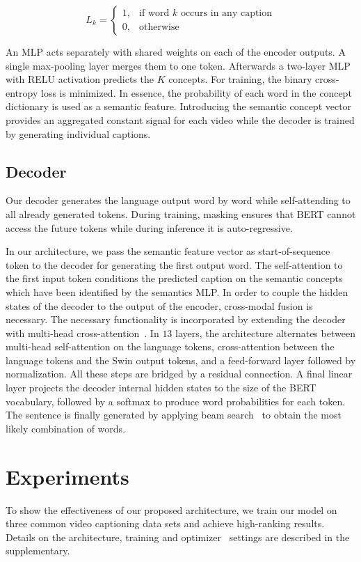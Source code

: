 \documentclass[runningheads,table]{llncs}
\begin{document}
$$
L_{k}=\begin{cases}
			1, & \text{if word }k \text{ occurs in any caption}\\
            0, & \text{otherwise}
		 \end{cases}
$$

An MLP acts separately with shared weights on each of the encoder outputs. A single max-pooling layer merges them to one token. Afterwards a two-layer MLP with RELU activation predicts the $K$ concepts. For training, the binary cross-entropy loss is minimized. In essence, the probability of each word in the concept dictionary is used as a semantic feature.
Introducing the semantic concept vector provides an aggregated constant signal for each video while the decoder is trained by generating individual captions. 

\subsection{Decoder}
Our decoder generates the language output word by word while self-attending to all already generated tokens. During training, masking ensures that BERT cannot access the future tokens while during inference it is auto-regressive. 

In our architecture, we pass the semantic feature vector as start-of-sequence token to the decoder for generating the first output word. The self-attention to the first input token conditions the predicted caption on the semantic concepts which have been identified by the semantics MLP.
In order to couple the hidden states of the decoder to the output of the encoder, cross-modal fusion is necessary. The necessary functionality is incorporated by extending the decoder with multi-head cross-attention~\cite{vaswani2017attention}. In $13$ layers, the architecture alternates between multi-head self-attention on the language tokens, cross-attention between the language tokens and the Swin output tokens, and a feed-forward layer followed by normalization. All these steps are bridged by a residual connection. 
A final linear layer projects the decoder internal hidden states to the size of the BERT vocabulary, followed by a softmax to produce word probabilities for each token. The sentence is finally generated by applying beam search~\cite{reddy1977speech} to obtain the most likely combination of words. 

 
\section{Experiments}
To show the effectiveness of our proposed architecture, we train our model on three common video captioning data sets and achieve high-ranking results.
Details on the architecture, training and optimizer~\cite{loshchilov2017decoupled} settings are described in the supplementary.
\end{document}
